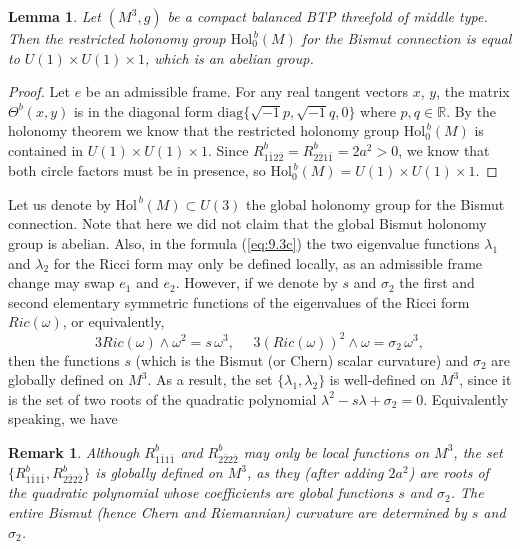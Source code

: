 \documentclass{amsart}
\numberwithin{equation}{section}
\newtheorem{lemma}  [theorem]     {Lemma}
\newtheorem{remark}  [theorem]     {Remark}
\theoremstyle{definition}
\renewcommand{\1}{\mathds{1}}
\renewcommand{\>}{\rightarrow}
\begin{document}
\begin{lemma}  \label{remark9.2}
Let $(M^3,g)$ be a compact balanced BTP threefold of middle type. Then the restricted holonomy group $\mbox{Hol}_0^{\,b}(M)$ for the Bismut connection is equal to $ U(1)\!\times \!U(1) \!\times \!1$, which is an abelian group.
\end{lemma}

\begin{proof}
Let $e$ be an admissible frame. For any real tangent vectors $x$, $y$, the matrix $\Theta^b(x,y)$ is in the diagonal form
$\mathrm{diag} \{ \sqrt{-1}p, \sqrt{-1}q, 0\}$ where $ p, q \in {\mathbb R}$. By the holonomy theorem we know that the restricted holonomy group $\mbox{Hol}_0^{\,b}(M)$ is contained in $U(1)\!\times \!U(1) \!\times \!1$. Since $R^b_{1\bar{1}2\bar{2}}=R^b_{2\bar{2}1\bar{1}}=2a^2>0$, we know that both circle factors must be in  presence, so  $\mbox{Hol}_0^{\,b}(M)= U(1)\!\times \!U(1) \!\times \!1$.
\end{proof}

Let us denote by $\mbox{Hol}^{\,b}(M)\subset U(3)$ the global holonomy group for the Bismut connection. Note that here we did not claim that the global Bismut holonomy group is abelian. Also, in the formula (\ref{eq:9.3c}) the two eigenvalue functions $\lambda_1$ and $\lambda_2$ for the Ricci form may only be defined locally, as an admissible frame change may swap $e_1$ and $e_2$. However, if we denote by $s$ and $\sigma_2$ the first and second elementary symmetric functions of the eigenvalues of the Ricci form $Ric(\omega)$, or equivalently,
$$ 3 Ric(\omega )\wedge \omega^2 = s \,\omega^3, \ \ \ \ \ \ 3 (Ric(\omega ))^2\wedge \omega = \sigma_2 \,\omega^3, $$
then the functions $s$ (which is the Bismut (or Chern) scalar curvature) and $\sigma_2$ are globally defined on $M^3$. As a result, the set $\{ \lambda_1, \lambda_2\}$ is well-defined on $M^3$, since it is the set of two roots of the quadratic polynomial $\lambda^2-s\lambda+\sigma_2=0$.  Equivalently speaking, we have

\begin{remark}
Although $R^b_{1\bar{1}1\bar{1}}$ and $R^b_{2\bar{2}2\bar{2}}$ may only be local functions on $M^3$, the set $\{ R^b_{1\bar{1}1\bar{1}}, R^b_{2\bar{2}2\bar{2}}\}$ is globally defined on $M^3$, as they (after adding $2a^2$) are roots of the quadratic polynomial whose coefficients are global functions $s$ and $\sigma_2$. The entire Bismut (hence Chern and Riemannian) curvature are determined by $s$ and $\sigma_2$.
\end{remark}
\end{document}
